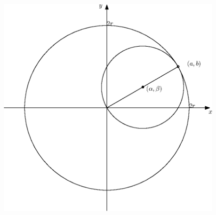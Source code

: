 \documentclass[a4paper, 12pt]{article}
\begin{document}
\begin{figure}
  \centering
  \includegraphics[width=0.5\linewidth]{images/geometry1}
  \caption{}
  \label{fig:circles1}
\end{figure}
\end{document}
